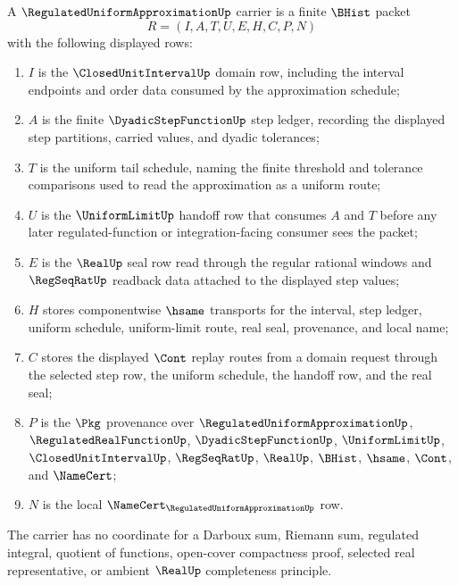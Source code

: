 \begin{definition}
\label{def:regulated-uniform-approximation-carrier}
A $\RegulatedUniformApproximationUp$ carrier is a finite $\BHist$ packet
$$
R=(I,A,T,U,E,H,C,P,N)
$$
with the following displayed rows:
\begin{enumerate}
\item $I$ is the $\ClosedUnitIntervalUp$ domain row, including the interval endpoints and order data consumed by the approximation schedule;
\item $A$ is the finite $\DyadicStepFunctionUp$ step ledger, recording the displayed step partitions, carried values, and dyadic tolerances;
\item $T$ is the uniform tail schedule, naming the finite threshold and tolerance comparisons used to read the approximation as a uniform route;
\item $U$ is the $\UniformLimitUp$ handoff row that consumes $A$ and $T$ before any later regulated-function or integration-facing consumer sees the packet;
\item $E$ is the $\RealUp$ seal row read through the regular rational windows and $\RegSeqRatUp$ readback data attached to the displayed step values;
\item $H$ stores componentwise $\hsame$ transports for the interval, step ledger, uniform schedule, uniform-limit route, real seal, provenance, and local name;
\item $C$ stores the displayed $\Cont$ replay routes from a domain request through the selected step row, the uniform schedule, the handoff row, and the real seal;
\item $P$ is the $\Pkg$ provenance over $\RegulatedUniformApproximationUp$, $\RegulatedRealFunctionUp$, $\DyadicStepFunctionUp$, $\UniformLimitUp$, $\ClosedUnitIntervalUp$, $\RegSeqRatUp$, $\RealUp$, $\BHist$, $\hsame$, $\Cont$, and $\NameCert$;
\item $N$ is the local $\NameCert_{\RegulatedUniformApproximationUp}$ row.
\end{enumerate}
The carrier has no coordinate for a Darboux sum, Riemann sum, regulated integral, quotient of functions, open-cover compactness proof, selected real representative, or ambient $\RealUp$ completeness principle.
\end{definition}

